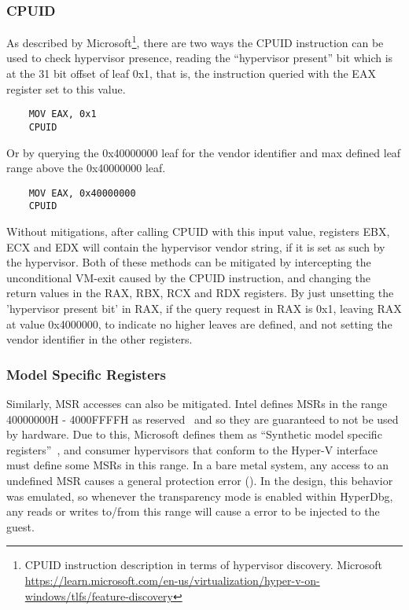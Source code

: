 \subsubsection{CPUID}
As described by Microsoft\footnote{CPUID instruction description in terms of hypervisor discovery. Microsoft \url{https://learn.microsoft.com/en-us/virtualization/hyper-v-on-windows/tlfs/feature-discovery}}, 
there are two ways the CPUID instruction can be used to check hypervisor presence, reading the “hypervisor present” bit which is at the 31 bit offset of leaf 0x1, that is, the instruction queried with the EAX register set to this value.
\begin{verbatim}
    MOV EAX, 0x1
    CPUID
\end{verbatim} 
Or by querying the 0x40000000 leaf for the vendor identifier and max defined leaf range above the 0x40000000 leaf. 
\begin{verbatim}
    MOV EAX, 0x40000000
    CPUID
\end{verbatim}
Without mitigations, after calling CPUID with this input value, registers EBX, ECX and EDX will contain the hypervisor vendor string, if it is set as such by the hypervisor.
Both of these methods can be mitigated by intercepting the unconditional VM-exit caused by the CPUID instruction, and changing the return values in the RAX, RBX, RCX and RDX registers. 
By just unsetting the 'hypervisor present bit' in RAX, if the query request in RAX is 0x1, leaving RAX at value 0x4000000, to indicate no higher leaves are defined, and not setting the vendor identifier in the other registers.

\subsubsection{Model Specific Registers}
Similarly, MSR accesses can also be mitigated. Intel defines MSRs in the range 40000000H - 4000FFFFH as reserved~\cite[Volume 4]{Intel-SDM2025} and so they are guaranteed to not be used by hardware. 
Due to this, Microsoft defines them as “Synthetic model specific registers”~\cite{microsoft_hv_interface_reqs}, and consumer hypervisors that conform to the Hyper-V  interface must define some MSRs in this range. 
In a bare metal system, any access to an undefined MSR causes a general protection error (). In the design, this behavior was emulated, 
so whenever the transparency mode is enabled within HyperDbg, any reads or writes to/from this range will cause a  error to be injected to the guest.

